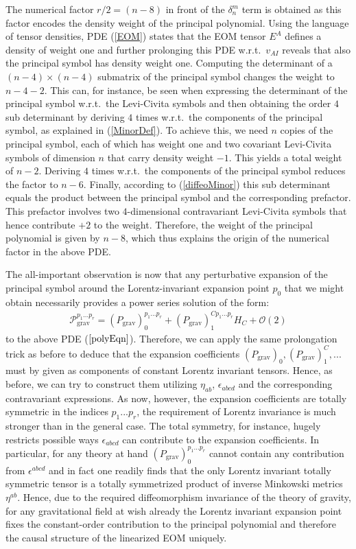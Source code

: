 The numerical factor $r/2 = (n-8)$ in front of the $\delta^m_n$ term is obtained as this factor encodes the density weight of the principal polynomial. Using the language of tensor densities, PDE (\ref{EOM}) states that the EOM tensor $E^A$ defines a density of weight one and further prolonging this PDE w.r.t.\ $v_{AI}$ reveals that also the principal symbol has density weight one. Computing the determinant of a $(n-4) \times (n-4)$ submatrix of the principal symbol changes the weight to $n-4-2$. This can, for instance, be seen when expressing the determinant of the principal symbol w.r.t.\ the Levi-Civita symbols and then obtaining the order $4$ sub determinant by deriving $4$ times w.r.t.\ the components of the principal symbol, as explained in (\ref{MinorDef}). To achieve this, we need $n$ copies of the principal symbol, each of which has weight one and two covariant Levi-Civita symbols of dimension $n$ that carry density weight $-1$. This yields a total weight of $n-2$. Deriving $4$ times w.r.t.\ the components of the principal symbol reduces the factor to $n-6$. Finally, according to (\ref{diffeoMinor}) this sub determinant equals the product between the principal symbol and the corresponding prefactor. This prefactor involves two $4$-dimensional contravariant Levi-Civita symbols that hence contribute $+2$ to the weight. Therefore, the weight of the principal polynomial is given by $n-8$, which thus explains the origin of the numerical factor in the above PDE. 

The all-important observation is now that any perturbative expansion of the principal symbol around the Lorentz-invariant expansion point $p_0$ that we might obtain necessarily provides a power series solution of the form:
\begin{align}
    \mathcal{P}_{\text{grav}}^{{p_1}...{p_{r}}} = (P_{\text{grav}})^{{p_1}...{p_{r}}}_0 + (P_{\text{grav}})_1^{C{p_1}...{p_{r}}} H_C + \mathcal{O}(2)
\end{align}
to the above PDE ($\ref{polyEqn}$). Therefore, we can apply the same prolongation trick as before to deduce that the expansion coefficients $(P_{\text{grav}})_0, (P_{\text{grav}})_1^C,...$ must by given as components of constant Lorentz invariant tensors. Hence, as before, we can try to construct them utilizing $\eta_{ab}$, $\epsilon_{abcd}$ and the corresponding contravariant expressions. As now, however, the expansion coefficients are totally symmetric in the indices $p_1...p_r$, the requirement of Lorentz invariance is much stronger than in the general case. The total symmetry, for instance, hugely restricts possible ways $\epsilon_{abcd}$ can contribute to the expansion coefficients. In particular, for any theory at hand $(P_{\text{grav}})_0^{{p_1}...{p_{r}}}$ cannot contain any contribution from $\epsilon^{abcd}$ and in fact one readily finds that the only Lorentz invariant totally symmetric tensor is a totally symmetrized product of inverse Minkowski metrics $\eta^{ab}$. Hence, due to the required diffeomorphism invariance of the theory of gravity, for any gravitational field at wish already the Lorentz invariant expansion point fixes the constant-order contribution to the principal polynomial and therefore the causal structure of the linearized EOM uniquely.

